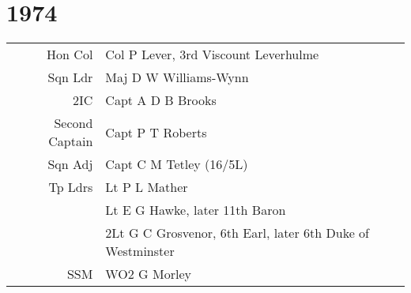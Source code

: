 \chapter*{1974}

\begin{center}
  \small
  \begin{tabular}{rl}
    Hon Col & Col P Lever, 3rd Viscount Leverhulme \\
    Sqn Ldr & Maj D W Williams-Wynn \\
    2IC & Capt A D B Brooks \\
    Second Captain & Capt P T Roberts \\
    Sqn Adj & Capt C M Tetley (16/5L) \\
    Tp Ldrs & Lt P L Mather \\
      & Lt E G Hawke, later 11th Baron \\
      & 2Lt G C Grosvenor, 6th Earl, later 6th Duke of Westminster \\
    SSM & WO2 G Morley
  \end{tabular}
\end{center}

